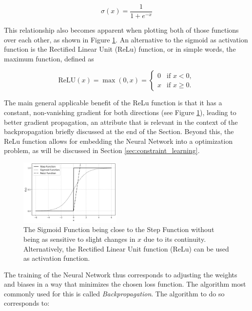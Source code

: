 \documentclass[preprint,12pt]{elsarticle}
\begin{document}
\[
\sigma(x) = \frac{1}{1 + e^{-x}}
\]

This relationship also becomes apparent when plotting both of those functions over each other, as shown in Figure \ref{fig:activation_functions}. 
An alternative to the sigmoid as activation function is the Rectified Linear Unit (ReLu) function, or in simple words, the maximum function, defined as

\[
\text{ReLU}(x) = \max(0, x) = 
\begin{cases}
	0 & \text{if } x < 0, \\
	x & \text{if } x \geq 0.
\end{cases}
\]

The main general applicable benefit of the ReLu function is that it has a constant, non-vanishing gradient for both directions (see Figure \ref{fig:activation_functions}), leading to better gradient propagation, an attribute that is relevant in the context of the backpropagation briefly discussed at the end of the Section. \cite{preprintReLuGlorot}
Beyond this, the ReLu function allows for embedding the Neural Network into a optimization problem, as will be discussed in Section \ref{sec:constraint_learning}.

\begin{figure}[h] 
	\centering
	\includegraphics[width=0.45\textwidth]{../figures/modelling/activation_functions.png} %
	\caption{The Sigmoid Function being close to the Step Function without being as sensitive to slight changes in $x$ due to its continuity. Alternatively, the Rectified Linear Unit function (ReLu) can be used as activation function. }
	\label{fig:activation_functions}
\end{figure}

\cite{nielsen2015neuralChap1}


The training of the Neural Network thus corresponds to adjusting the weights and biases in a way that minimizes the chosen loss function. The algorithm most commonly used for this is called \textit{Backpropagation}. \cite{nielsen2015neuralChap1}
The algorithm to do so corresponds to: 
\end{document}
